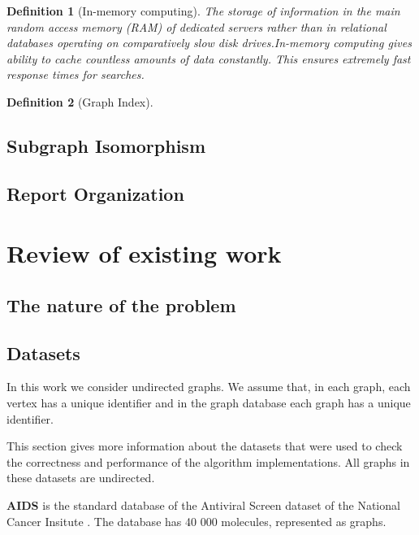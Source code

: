 \documentclass{l4proj}
\newtheorem{definition}{Definition}
\begin{document}
        \begin{definition}[In-memory computing]
        The storage of information in the main random access memory (RAM) of dedicated servers rather than in relational databases operating on comparatively slow disk drives.In-memory computing gives ability to cache countless amounts of data constantly. This ensures extremely fast response times for searches.
        \end{definition}
        
        \begin{definition} [Graph Index]
		
		\end{definition}

	\section{Subgraph Isomorphism}
    \section{Report Organization}

\chapter{Review of existing work}
\section{The nature of the problem}

\section{Datasets}
\label{sec:datasets}

    In this work we consider undirected graphs. We assume that, in each graph, each vertex has a unique identifier and in the graph database each graph has a unique identifier. 

This section gives more information about the datasets that were used to check the correctness and performance of the algorithm implementations. All graphs in these datasets are undirected.\par
\textbf{AIDS} is the standard database of the Antiviral Screen dataset of the National Cancer Insitute \cite{datasets}. The database has 40 000 molecules, represented as graphs. 
\end{document}
